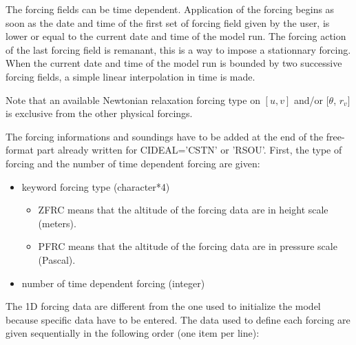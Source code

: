 The forcing fields can be time dependent. Application of the forcing begins as
soon as the date and time of the first set of forcing field given by the
user, is lower or equal to the current date and time of the model run. The
forcing action of the last forcing field is remanant, this is a way to impose
a stationnary forcing. When the current date and time of the model run is
bounded by two successive forcing fields, a simple linear interpolation in time
is made.

Note that an available Newtonian relaxation forcing type on $[u, v]$ and/or
$[\theta$, $r_v]$ is exclusive from the other physical forcings.

The forcing informations and soundings have to be added at the end of the
free-format part already written for CIDEAL='CSTN' or 'RSOU'. First, the
type of forcing and the number of time dependent forcing are given:

\begin{itemize}
\item keyword forcing type (character*4)
\begin{itemize}
\item ZFRC means that the altitude of the forcing data are in height scale
(meters).
\item PFRC means that the altitude of the forcing data are in pressure scale
(Pascal).
\end{itemize}

\item number of time dependent forcing (integer)
\end{itemize}

The 1D forcing data are different from the one used to initialize the model
because specific data have to be entered. The data used to define each forcing
are given sequentially in the following order (one item per line):

